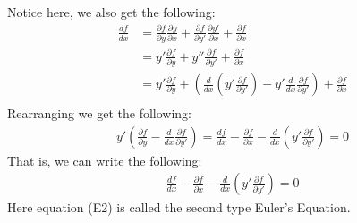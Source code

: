 \documentclass[11pt,oneside]{book}
\theoremstyle{break}
\theoremstyle{break}
\begin{document}
Notice here, we also get the following:
\begin{align*}
\frac{d f}{d x} &= \frac{\partial f}{\partial y}\frac{\partial y}{\partial x} + \frac{\partial f}{\partial y'}\frac{\partial y'}{\partial x} + \frac{\partial f}{\partial x} \\
&= y' \frac{\partial f}{\partial y}+ y'' \frac{\partial f}{\partial y'} + \frac{\partial f}{\partial x}\\
&= y' \frac{\partial f}{\partial y}+ \left(\frac{d}{dx}\left(y' \frac{\partial f}{\partial y'}\right) - y'\frac{d}{dx}\frac{\partial f}{\partial y'} \right) + \frac{\partial f}{\partial x}\\
\end{align*}
Rearranging we get the following:
\begin{align*}
y'\left( \frac{\partial f}{\partial y}-\frac{d}{dx}\frac{\partial f}{\partial y'}\right) = \frac{df}{dx}-\frac{\partial f}{\partial x} - \frac{d}{dx}\left( y'\frac{\partial f}{\partial y'} \right)= 0
\end{align*}
That is, we can write the following:
\begin{align*}
\frac{df}{dx}-\frac{\partial f}{\partial x} - \frac{d}{dx}\left( y'\frac{\partial f}{\partial y'} \right)= 0 \tag{E2}
\end{align*}
Here equation (E2) is called the second type Euler's Equation. \\
\end{document}

